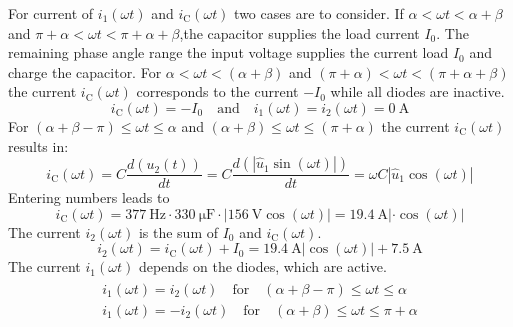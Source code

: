 \begin{solutionblock}
    For current of $i_\mathrm{1}(\omega t)$ and  $i_\mathrm{C}(\omega t)$ two cases are to consider. If $\alpha<\omega t<\alpha+\beta$
    and $\pi+\alpha<\omega t<\pi+\alpha+\beta$,the capacitor supplies the load current $I_{\mathrm{0}}$.
    The remaining phase angle range the input voltage supplies the current load $I_{\mathrm{0}}$ and charge the capacitor.
    For $\alpha<\omega t<(\alpha+\beta)$ and $(\pi+\alpha)<\omega t<(\pi+\alpha+\beta)$ the current $i_\mathrm{C}(\omega t)$ 
    corresponds to the current $-I_{\mathrm{0}}$ while all diodes are inactive.
    \begin{equation} 
        i_\mathrm{C}(\omega t)=-I_{\mathrm{0}} \quad \text{and} \quad i_\mathrm{1}(\omega t)= i_\mathrm{2}(\omega t)= \SI{0}{\ampere}
    \end{equation}
    For $(\alpha+\beta-\pi)\leq\omega t\leq\alpha$ and $(\alpha+\beta)\leq\omega t\leq(\pi+\alpha)$ the current $i_\mathrm{C}(\omega t)$ results in:
    \begin{equation} 
        i_\mathrm{C}(\omega t)=C\frac{d(u_\mathrm{2}(t))}{dt}=C\frac{d(\left| \hat{u}_\mathrm{1}\sin(\omega t)\right|)}{dt}
        = \omega C \left|\hat{u}_\mathrm{1}\cos(\omega t)\right| 
    \end{equation}
    Entering numbers leads to
    \begin{equation} 
        i_\mathrm{C}(\omega t)= \SI{377}{\hertz} \cdot \SI{330}{\micro\farad} \cdot  \left|\SI{156}{\volt}\cos(\omega t)\right|
        =\SI{19.4}{\ampere}\left| \cdot \cos(\omega t)\right| 
    \end{equation}
    The current $i_\mathrm{2}(\omega t)$ is the sum of $I_{\mathrm{0}}$ and $i_\mathrm{C}(\omega t)$.
    \begin{equation} 
        i_\mathrm{2}(\omega t)=i_\mathrm{C}(\omega t) + I_{\mathrm{0}}=\SI{19.4}{\ampere}\left|\cos(\omega t)\right| + \SI{7.5}{\ampere}
    \end{equation}
    The current $i_\mathrm{1}(\omega t)$ depends on the diodes, which are active.
    \begin{align}
        \begin{split}
            i_\mathrm{1}(\omega t)=i_\mathrm{2}(\omega t) \quad \text{for} \quad (\alpha+\beta-\pi)\leq\omega t\leq\alpha \\
            i_\mathrm{1}(\omega t)=-i_\mathrm{2}(\omega t) \quad \text{for} \quad (\alpha+\beta)\leq\omega t\leq\pi+\alpha
        \end{split}
    \end{align}
\end{solutionblock}

